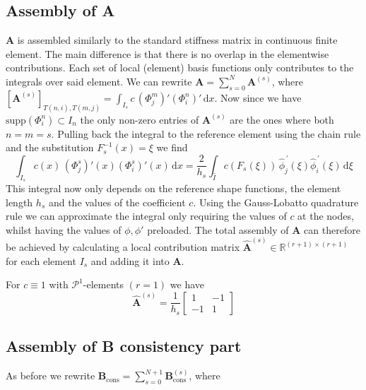 \subsection{Assembly of A}
$\textbf{A}$ is assembled similarly to the standard stiffness matrix in continuous finite element. The main difference is that there is no overlap in the elementwise contributions.
Each set of local (element) basis functions only contributes to the integrals over said element.
We can rewrite $\textbf{A} = \sum_{s=0}^{N} \textbf{A}^{(s)}$, where
$[\textbf{A}^{(s)}]_{T(n,i),T(m,j)} = \int_{I_s} c \,(\Phi_j^m)' (\Phi_i^n)' \, \text{d}x$.
Now since we have $\text{supp}(\Phi_i^n)\subset I_n$ the only non-zero entries of $\textbf{A}^{(s)} $ are the ones where both $n=m=s$. Pulling back the integral
to the reference element using the chain rule and the substitution $F_s^{-1}(x) = \xi$ we find
\begin{equation*}
	\int_{I_s} c(x) \,(\Phi_j^s)'(x) (\Phi_i^s)'(x) \, \text{d}x =
	\frac{2}{h_s} \int_{\hat{I}} c(F_s(\xi)) \, \widehat{\phi}_j^{\, \prime}(\xi) \widehat{\phi}_i^{\, \prime}(\xi) \, \text{d}\xi
\end{equation*}
This integral now only depends on the reference shape functions, the element length $h_s$
and the values of the coefficient $c$. Using the Gauss-Lobatto quadrature rule we can approximate the integral
only requiring the values of $c$ at the nodes, whilst having the values of $\phi, \phi'$ preloaded.
The total assembly of $\textbf{A}$ can therefore be achieved by calculating a local contribution matrix
$\widehat{\textbf{A}}^{(s)} \in \mathbb{R}^{(r+1)\times (r+1)}$ for each element $I_s$ and adding it into $\textbf{A}$.
\begin{example}
	For $c\equiv 1$ with $\mathcal{P}^1$-elements $(r=1)$ we have
	\begin{equation*}
		\widehat{\textbf{A}}^{(s)} = \frac{1}{h_s}
		\begin{bmatrix}
			1  & -1 \\
			-1 & 1
		\end{bmatrix}
	\end{equation*}
\end{example}

\subsection{Assembly of B consistency part}
\label{subsec:assembly_cons}
As before we rewrite $\textbf{B}_{\text{cons}} = \sum_{s=0}^{N+1} \textbf{B}_{\text{cons}}^{(s)} $, where

